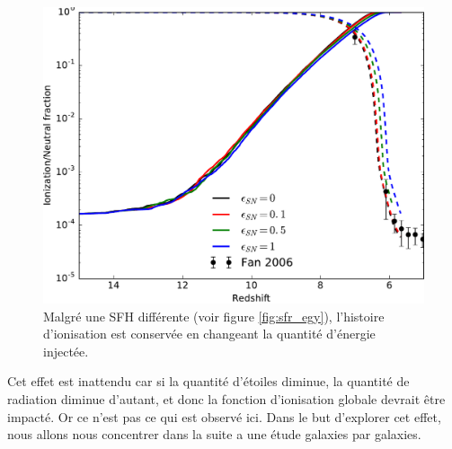 \begin{figure}[bth]
        \includegraphics[width=.95\textwidth]{img/03/sneff_xion.pdf} 
        \caption{Malgré une SFH différente (voir figure \ref{fig:sfr_egy}), l'histoire d'ionisation est conservée en changeant la quantité d'énergie injectée.
        }
 		\label{fig:xion_sneff}
\end{figure}

Cet effet est inattendu car si la quantité d'étoiles diminue, la quantité de radiation diminue d'autant, et donc la fonction d'ionisation globale devrait être impacté.
Or ce n'est pas ce qui est observé ici.
Dans le but d'explorer cet effet, nous allons nous concentrer dans la suite a une étude galaxies par galaxies.











